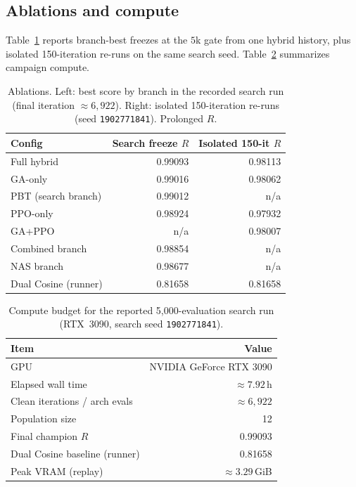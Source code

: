 \subsection{Ablations and compute}
\label{sec:ablation-compute}

Table~\ref{tab:ablation} reports branch-best freezes at the $5$k gate from one hybrid history, plus isolated 150-iteration re-runs on the same search seed.
Table~\ref{tab:compute} summarizes campaign compute.

\begin{table}[t]
  \centering
  \caption{Ablations. Left: best score by branch in the recorded search run (final iteration ${\approx}6{,}922$). Right: isolated 150-iteration re-runs (seed \texttt{1902771841}). Prolonged $R$.}
  \label{tab:ablation}
  \setlength{\tabcolsep}{3pt}
  \begin{tabular}{@{}lrr@{}}
    \toprule
    Config & Search freeze $R$ & Isolated 150-it $R$ \\
    \midrule
    Full hybrid & 0.99093 & 0.98113 \\
    GA-only & 0.99016 & 0.98062 \\
    PBT (search branch) & 0.99012 & n/a \\
    PPO-only & 0.98924 & 0.97932 \\
    GA+PPO & n/a & 0.98007 \\
    Combined branch & 0.98854 & n/a \\
    NAS branch & 0.98677 & n/a \\
    Dual Cosine (runner) & 0.81658 & 0.81658 \\
    \bottomrule
  \end{tabular}
\end{table}

\begin{table}[t]
  \centering
  \caption{Compute budget for the reported 5,000-evaluation search run (RTX~3090, search seed \texttt{1902771841}).}
  \label{tab:compute}
  \setlength{\tabcolsep}{3pt}
  \begin{tabular}{@{}lr@{}}
    \toprule
    Item & Value \\
    \midrule
    GPU & NVIDIA GeForce RTX 3090 \\
    Elapsed wall time & ${\approx}7.92$\,h \\
    Clean iterations / arch evals & ${\approx}6{,}922$ \\
    Population size & 12 \\
    Final champion $R$ & 0.99093 \\
    Dual Cosine baseline (runner) & 0.81658 \\
    Peak VRAM (replay) & ${\approx}3.29$\,GiB \\
    \bottomrule
  \end{tabular}
\end{table}

